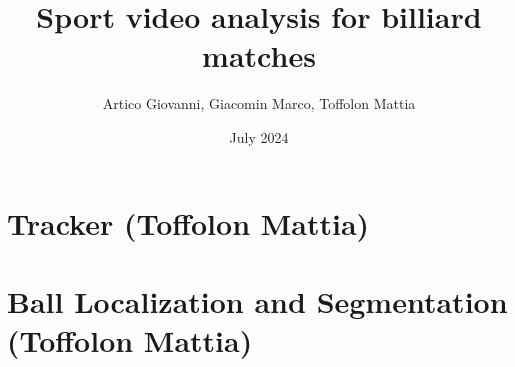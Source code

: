 \documentclass{article}
\title{\huge \textbf{Sport video analysis for billiard matches}
}
\author{Artico Giovanni, Giacomin Marco, Toffolon Mattia}
\date{July 2024}
\begin{document}
\maketitle

% 
% 
% 
% 
% 

\section*{Tracker (Toffolon Mattia)}


\section*{Ball Localization and Segmentation (Toffolon Mattia)}

\end{document}
